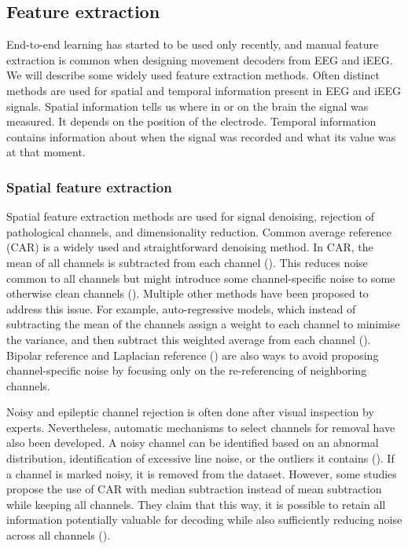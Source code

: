 \subsection{Feature extraction}
End-to-end learning has started to be used only recently, and manual feature extraction is common when designing movement decoders from EEG and iEEG.
We will describe some widely used feature extraction methods. 
Often distinct methods are used for spatial and temporal information present in EEG and iEEG signals. 
Spatial information tells us where in or on the brain the signal was measured. It depends on the position of the electrode.
Temporal information contains information about when the signal was recorded and what its value was at that moment.
\subsubsection{Spatial feature extraction}
Spatial feature extraction methods are used for signal denoising, rejection of pathological channels, and dimensionality reduction.
 Common average reference (CAR) is a widely used and straightforward denoising method.
 In CAR, the mean of all channels is subtracted from each channel (\cite{liu-effects-2015}).
 This reduces noise common to all channels but might introduce some channel-specific noise to some otherwise clean channels (\cite{volkova-review}). 
 Multiple other methods have been proposed to address this issue.
 For example, auto-regressive models, which instead of subtracting the mean of the channels assign a weight to each channel to minimise the variance, and then subtract this weighted average from each channel (\cite{adaptive-laplacian-reference}).
 Bipolar reference and Laplacian reference (\cite{yao2019reference, laplacian-reference}) are also ways to avoid proposing channel-specific noise by focusing only on the re-referencing of neighboring channels.
 
 
Noisy and epileptic channel rejection is often done after visual inspection by experts. Nevertheless, automatic mechanisms to select channels for removal have also been developed. A noisy channel can be identified based on an abnormal distribution, identification of excessive line noise, or the outliers it contains (\cite{liu-effects-2015}). If a channel is marked noisy, it is removed from the dataset. However, some studies propose the use of CAR with median subtraction instead of mean subtraction while keeping all channels. They claim that this way, it is possible to retain all information potentially valuable for decoding while also sufficiently reducing noise across all channels (\cite{liu-effects-2015}). 

